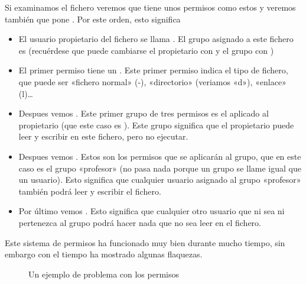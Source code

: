 \documentclass[letterpaper,10pt,spanish]{sphinxmanual}
\begin{document}
Si examinamos el fichero  veremos que tiene unos permisos como estos  y veremos también que pone  . Por este orden, esto significa
\begin{itemize}
\item {} 
El usuario propietario del fichero se llama . El grupo asignado a este fichero es  (recuérdese que puede cambiarse el propietario con  y el grupo con  )

\item {} 
El primer permiso tiene un \sphinxcode{\sphinxupquote{-}}. Este primer permiso indica el tipo de fichero, que puede ser «fichero normal» (-), «directorio» (veriamos «d»), «enlace» (l)…

\item {} 
Despues vemos . Este primer grupo de tres permisos es el aplicado al propietario (que este caso es ). Este grupo significa que el propietario puede leer y escribir en este fichero, pero no ejecutar.

\item {} 
Despues vemos . Estos son los permisos que se aplicarán al grupo, que en este caso es el grupo «profesor» (no pasa nada porque un grupo se llame igual que un usuario). Esto significa que cualquier usuario asignado al grupo «profesor» también podrá leer y escribir el fichero.

\item {} 
Por último vemos  . Esto significa que cualquier otro usuario que ni sea  ni pertenezca al grupo  podrá hacer nada que no sea leer en el fichero.

\end{itemize}

Este sistema de permisos ha funcionado muy bien durante mucho tiempo, sin embargo con el tiempo ha mostrado algunas flaquezas.

\begin{figure}[htbp]
\centering
\capstart

\noindent{}
\caption{Un ejemplo de problema con los permisos}\label{\detokenize{tema_pautas_seguridad_informatica/tema_pautas_seguridad_informatica:id2}}\end{figure}
\end{document}
